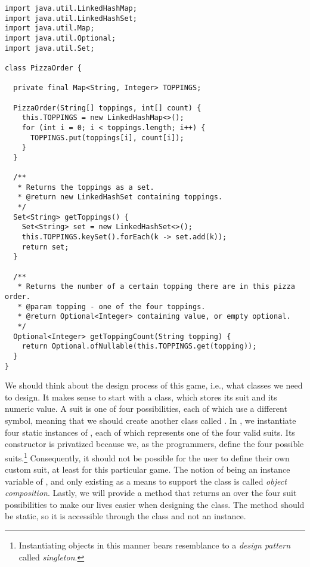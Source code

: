 \enlargethispage{-4\baselineskip}
\begin{lstlisting}[language=MyJava]
import java.util.LinkedHashMap;
import java.util.LinkedHashSet;
import java.util.Map;
import java.util.Optional;
import java.util.Set;

class PizzaOrder {

  private final Map<String, Integer> TOPPINGS;

  PizzaOrder(String[] toppings, int[] count) {
    this.TOPPINGS = new LinkedHashMap<>();
    for (int i = 0; i < toppings.length; i++) {
      TOPPINGS.put(toppings[i], count[i]);
    }
  }

  /**
   * Returns the toppings as a set.
   * @return new LinkedHashSet containing toppings.
   */
  Set<String> getToppings() {
    Set<String> set = new LinkedHashSet<>();
    this.TOPPINGS.keySet().forEach(k -> set.add(k));
    return set;
  }

  /**
   * Returns the number of a certain topping there are in this pizza order.
   * @param topping - one of the four toppings.
   * @return Optional<Integer> containing value, or empty optional.
   */
  Optional<Integer> getToppingCount(String topping) {
    return Optional.ofNullable(this.TOPPINGS.get(topping));
  }
}
\end{lstlisting}

We should think about the design process of this game, i.e., what classes we need to design. 
It makes sense to start with a  class, which stores its suit and its numeric value. 
A suit is one of four possibilities, each of which use a different symbol, meaning that we should create another class called . 
In , we instantiate four static instances of , each of which represents one of the four valid suits. 
Its constructor is privatized because we, as the programmers, define the four possible suits.\footnote{Instantiating objects in this manner bears resemblance to a \emph{design pattern} called \emph{singleton}.} 
Consequently, it should not be possible for the user to define their own custom suit, at least for this particular game. 
The notion of  being an instance variable of , and only existing as a means to support the  class is called \emph{object composition}. 
Lastly, we will provide a method that returns an  over the four suit possibilities to make our lives easier when designing the  class. 
The method should be static, so it is accessible through the class and not an instance.

